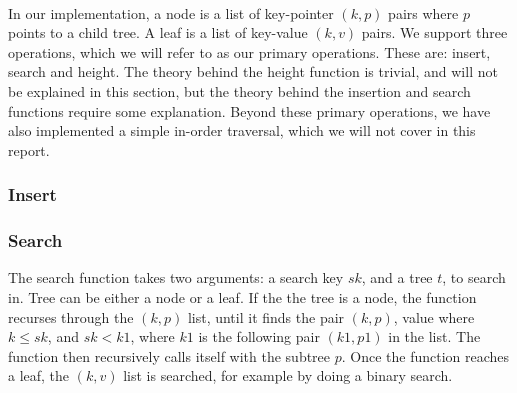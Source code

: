 \paragraph{}
In our implementation, a node is a list of key-pointer $(k, p)$ pairs where $p$ points to a child tree. A leaf is a list of key-value $(k, v)$ pairs. We support three operations, which we will refer to as our primary operations. These are: insert, search and height. The theory behind the height function is trivial, and will not be explained in this section, but the theory behind the insertion and search functions require some explanation. Beyond these primary operations, we have also implemented a simple in-order traversal, which we will not cover in this report.

\subsubsection{Insert}


\subsubsection{Search}
The search function takes two arguments: a search key $sk$, and a tree $t$, to search in. Tree can be either a node or a leaf. If the the tree is a node, the function recurses through the $(k, p)$ list, until it finds the pair $(k, p)$, value where $k \le sk$, and $sk < k1$, where $k1$ is the following pair $(k1, p1)$ in the list. The function then recursively calls itself with the subtree $p$. Once the function reaches a leaf, the $(k, v)$ list is searched, for example by doing a binary search.
